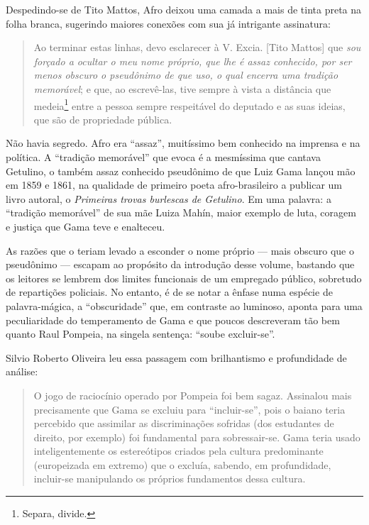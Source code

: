Despedindo-se de Tito Mattos, Afro deixou uma camada a mais de
tinta preta na folha branca, sugerindo maiores conexões com sua já
intrigante assinatura:

\begin{quote}
Ao terminar estas linhas, devo esclarecer à V. Excia. {[}Tito Mattos{]}
que \textit{sou forçado a ocultar o meu nome próprio, que lhe é assaz
conhecido, por ser menos obscuro o pseudônimo de que uso, o qual encerra
uma tradição memorável}; e que, ao escrevê-las, tive sempre à vista a
distância que medeia\footnote{Separa, divide.} entre a pessoa sempre
respeitável do deputado e as suas ideias, que são de propriedade
pública.
\end{quote}

Não havia segredo. Afro era ``assaz'', muitíssimo bem conhecido na
imprensa e na política. A ``tradição memorável'' que evoca é a mesmíssima
que cantava Getulino, o também assaz conhecido pseudônimo de que
Luiz Gama lançou mão em 1859 e 1861, na qualidade de primeiro poeta
afro-brasileiro a publicar um livro autoral, o \emph{Primeiras trovas
burlescas de Getulino}. Em uma palavra: a ``tradição memorável'' de sua
mãe Luiza Mahín, maior exemplo de luta, coragem e justiça que Gama teve
e enalteceu.

As razões que o teriam levado a esconder o nome próprio --- mais obscuro
que o pseudônimo --- escapam ao propósito da introdução desse volume,
bastando que os leitores se lembrem dos limites funcionais de um
empregado público, sobretudo de repartições policiais. No entanto, é de
se notar a ênfase numa espécie de palavra-mágica, a ``obscuridade'' que,
em contraste ao luminoso, aponta para uma peculiaridade do temperamento
de Gama e que poucos descreveram tão bem quanto Raul Pompeia, na singela
sentença: ``soube excluir-se''.

Silvio Roberto Oliveira leu essa passagem com brilhantismo e
profundidade de análise:

\begin{quote}
O jogo de raciocínio operado por Pompeia foi bem sagaz. Assinalou mais
precisamente que Gama se excluiu para ``incluir-se'', pois o baiano teria
percebido que assimilar as discriminações sofridas (dos estudantes de
direito, por exemplo) foi fundamental para sobressair-se. Gama teria
usado inteligentemente os estereótipos criados pela cultura predominante
(europeizada em extremo) que o excluía, sabendo, em profundidade,
incluir-se manipulando os próprios fundamentos dessa cultura.
\end{quote}

